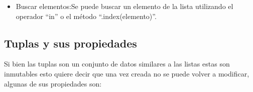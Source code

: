 \begin{itemize}
    \item Buscar elementos:Se puede buscar un elemento de la lista utilizando el operador “in” o el método ``.index(elemento)''.
    \begin{figure}[h]
        \centering
      \end{figure}
    
      \begin{figure}[h]
        \centering
      \end{figure}
\end{itemize}

\subsection{Tuplas y sus propiedades}
Si bien las tuplas son un conjunto de datos similares a las listas estas son inmutables esto quiere decir que una vez creada no se puede volver a modificar, algunas de sus propiedades son:

